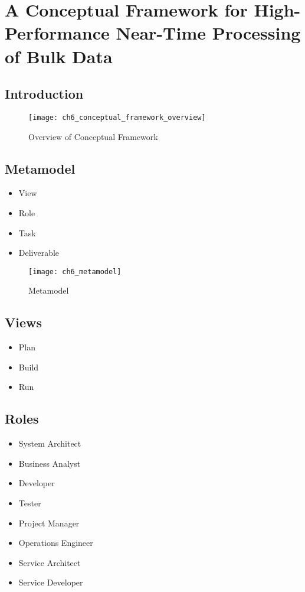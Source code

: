 

\chapter[Conceptual Framework]{A Conceptual Framework for High-Performance Near-Time Processing of Bulk Data}\label{ch:conceptual_framework}


\section{Introduction} 
\begin{figure}
	[htpb] \centering 
	\texttt{[image: ch6\_conceptual\_framework\_overview]} \caption{Overview of Conceptual Framework} \label{fig:ch6_conceptional_framework_overview} 
\end{figure}

\section{Metamodel} 
\begin{itemize}
	\item View
	\item Role
	\item Task
	\item Deliverable
\end{itemize}

\begin{figure}
	[htpb] \centering 
	\texttt{[image: ch6\_metamodel]} 
	\caption{Metamodel} 
	\label{fig:ch6_metamodel} 
\end{figure}

\section{Views}
\begin{itemize}
	\item Plan
	\item Build
	\item Run
\end{itemize}

\section{Roles} 
\begin{itemize}
	\item System Architect 
	\item Business Analyst 
	\item Developer 
	\item Tester 
	\item Project Manager 
	\item Operations Engineer 
	\item Service Architect 
	\item Service Developer
\end{itemize}

